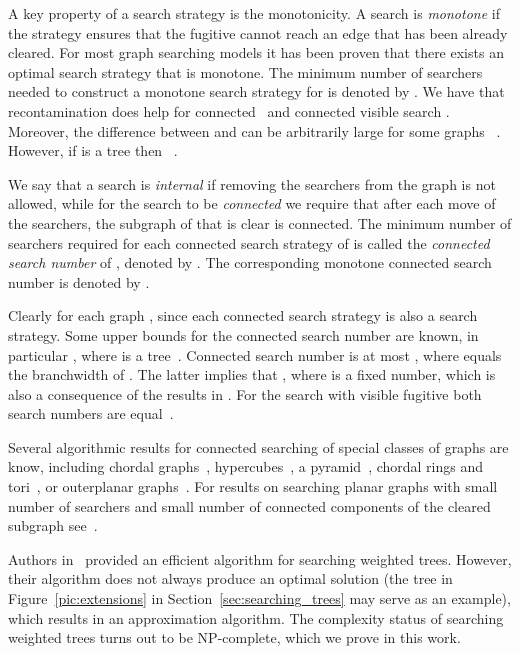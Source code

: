 \documentclass[10pt]{article}
\begin{document}
A key property of a search strategy is the monotonicity. A search is \emph{monotone} if the strategy ensures that the fugitive cannot reach an edge that has been already cleared. For most graph searching models it has been proven that there exists an optimal search strategy that is monotone. The minimum number of searchers needed to construct a monotone search strategy for  is denoted by .
We have that recontamination does help for connected~\cite{sweeping_large_cliques} and connected visible search \cite{monotony_properties_connected_visible}. Moreover, the difference between  and  can be arbitrarily large for some graphs ~\cite{sweeping_large_cliques}. However, if  is a tree then ~\cite{connected_weighted_trees}.

We say that a search is \emph{internal} if removing the searchers from the graph is not allowed, while for the search to be \emph{connected} we require that after each move of the searchers, the subgraph of  that is clear is connected. The minimum number of searchers required for each connected search strategy of  is called the \emph{connected search number} of , denoted by . The corresponding monotone connected search number is denoted by .

Clearly  for each graph , since each connected search strategy is also a search strategy. Some upper bounds for the connected search number are known, in particular , where  is a tree~\cite{searching_not_jumping}. Connected search number is at most , where  equals the branchwidth of  \cite{price_of_connectedness}. The latter implies that , where  is a fixed number, which is also a consequence of the results in \cite{connected_treewidth}. For the search with visible fugitive both search numbers are equal~\cite{connected_treewidth}.

Several algorithmic results for connected searching of special classes of graphs are know, including chordal graphs~\cite{connected_searching_chordal_graphs}, hypercubes~\cite{hypercubes,contiguous_hypercube}, a pyramid~\cite{pyramid}, chordal rings and tori~\cite{chordal_rings_tori}, or outerplanar graphs~\cite{connected_outerplanar}.
For results on searching planar graphs with small number of searchers and small number of connected components of the cleared subgraph see~\cite{Nowakowski_flooding}.

Authors in~\cite{connected_weighted_trees} provided an efficient algorithm for searching weighted trees. However, their algorithm does not always produce an optimal solution (the tree in Figure~\ref{pic:extensions} in Section~\ref{sec:searching_trees} may serve as an example), which results in an approximation algorithm. The complexity status of searching weighted trees turns out to be NP-complete, which we prove in this work.
\end{document}
